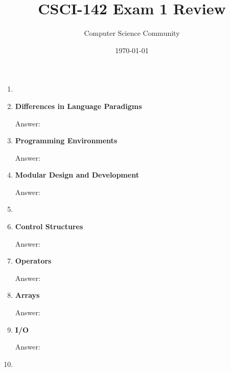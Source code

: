 \documentclass[11pt]{article}
\title{CSCI-142 Exam 1 Review}
\author{Computer Science Community}
\date{\today}
\newenvironment{answer}{\large\lstset{basicstyle=\tiny\ttfamily}\color{white} \small{Answer:}}{}
\newenvironment{answer}{\large\lstset{basicstyle=\large\ttfamily}\color{red} \small{Answer:}}{}
\begin{document}
\header
	\begin{enumerate}

\item 



\item \textbf{Differences in Language Paradigms}

\begin{answer}
\end{answer}



\item \textbf{Programming Environments}

\begin{answer}
\end{answer}



\item \textbf{Modular Design and Development}

\begin{answer}
\end{answer}



\item 



\item \textbf{Control Structures}

\begin{answer}
\end{answer}



\item \textbf{Operators}

\begin{answer}
\end{answer}



\item \textbf{Arrays}

\begin{answer}
\end{answer}



\item \textbf{I/O}

\begin{answer}
\end{answer}



\item 




\end{enumerate}
\end{document}
